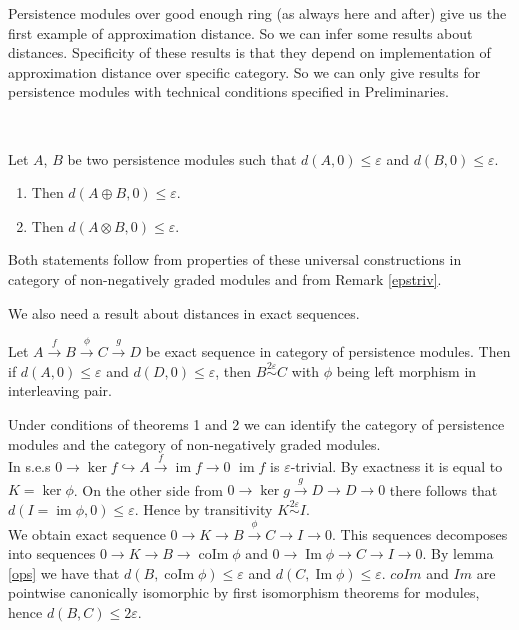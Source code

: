 Persistence modules over good enough ring (as always here and after) give us the first example of approximation distance. So we can infer some results about distances. Specificity of these results is that they depend on implementation of approximation distance over specific category. So we can only give results for persistence modules with technical conditions specified in Preliminaries.\\

\begin{proposition} ~ \par
  Let $A$, $B$ be two persistence modules such that $d(A,0) \leq \varepsilon$ and $d(B,0) \leq \varepsilon$.
  \begin{enumerate}
    \item Then $d(A \oplus B,0) \leq \varepsilon$.
    \item Then $d(A \otimes B,0) \leq \varepsilon$.
  \end{enumerate}
\end{proposition}

\begin{pf}
  Both statements follow from properties of these universal constructions in category of non-negatively graded modules and from Remark \ref{epstriv}.
\end{pf}

We also need a result about distances in exact sequences.\\

\begin{proposition}
  \label{major}
  Let $A \xrightarrow{f} B \xrightarrow{\phi} C \xrightarrow{g} D$ be exact sequence in category of persistence modules. Then if $d(A,0) \leq \varepsilon$ and $d(D,0) \leq \varepsilon$, then $B \stackrel{2\varepsilon}{\sim} C$ with $\phi$ being left morphism in interleaving pair.
\end{proposition}

\begin{pf}
  Under conditions of theorems 1 and 2 we can identify the category of persistence modules and the category of non-negatively graded modules.\\

  In s.e.s $0 \to \ker{f} \hookrightarrow A \xrightarrow{f} \operatorname{im}f \to 0$ $\operatorname{im}f$ is $\varepsilon$-trivial. By exactness it is equal to $K = \ker \phi$. On the other side from $0 \to \ker{g} \xrightarrow{g} D \to D \to 0$ there follows that $d(I = \operatorname{im} \phi, 0) \leq \varepsilon$. Hence by transitivity $K \stackrel{2\varepsilon}{\sim} I$.\\

  We obtain exact sequence $0 \to K \to B \xrightarrow{\phi} C \to I \to 0$. This sequences decomposes into sequences $0 \to K \to B \to \operatorname{coIm}\phi$ and $0 \to \operatorname{Im}\phi \to C \to I \to 0$. By lemma \ref{ops} we have that $d(B,\operatorname{coIm}\phi) \leq \varepsilon$ and $d(C,\operatorname{Im}\phi) \leq \varepsilon$. $coIm$ and $Im$ are pointwise canonically isomorphic by first isomorphism theorems for modules, hence $d(B,C) \leq 2\varepsilon$.
\end{pf}\\
